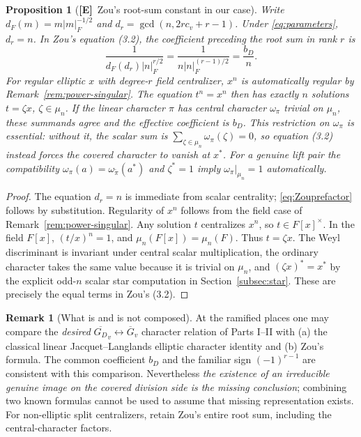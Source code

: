 \documentclass[11pt]{article}
\newcommand{\Gb}{\overline G}
\newcommand{\GDb}{\overline{G_D}}
\newcommand{\Etag}{\textnormal{\textbf{[E]}}}
\theoremstyle{plain}
\newtheorem{proposition}[theorem]{Proposition}
\theoremstyle{definition}
\newtheorem{remark}[theorem]{Remark}
\begin{document}
\begin{proposition}[\Etag\ Zou's root-sum constant in our case]\label{prop:Zouconstant}
Write $d_F(m)=m|m|_F^{-1/2}$ and
$d_r=\gcd(n,2rc_v+r-1)$.  Under \eqref{eq:parameters},
$d_r=n$.  In Zou's equation (3.2), the coefficient preceding
the root sum in rank $r$ is
\begin{equation}\label{eq:Zouprefactor}
 \frac{1}{d_F(d_r)|n|_F^{r/2}}
 =\frac{1}{n|n|_F^{(r-1)/2}}=\frac{b_D}{n}.
\end{equation}
For regular elliptic $x$ with degree-$r$ field centralizer,
$x^n$ is automatically regular by Remark~\ref{rem:power-singular}.
The equation $t^n=x^n$ then has exactly $n$ solutions
$t=\zeta x$, $\zeta\in\mu_n$.  If the linear character
$\pi$ has central character $\omega_\pi$ trivial on $\mu_n$,
these summands agree and the effective coefficient is $b_D$.
This restriction on $\omega_\pi$ is essential: without it, the
scalar sum is $\sum_{\zeta\in\mu_n}\omega_\pi(\zeta)=0$,
so equation (3.2) instead forces the covered character to vanish
at $x^*$.  For a genuine lift pair the compatibility
$\omega_\pi(a)=\omega_{\widetilde\pi}(a^*)$
and $\zeta^*=1$ imply $\omega_\pi|_{\mu_n}=1$ automatically.
\end{proposition}
\begin{proof}
The equation $d_r=n$ is immediate from scalar centrality;
\eqref{eq:Zouprefactor} follows by substitution.  Regularity of
$x^n$ follows from the field case of Remark~\ref{rem:power-singular}.
Any solution $t$ centralizes $x^n$, so $t\in F[x]^\times$.  In the field $F[x]$, $(t/x)^n=1$,
and $\mu_n(F[x])=\mu_n(F)$.  Thus $t=\zeta x$.
The Weyl discriminant is invariant under central scalar
multiplication, the ordinary character takes the same value
because it is trivial on $\mu_n$, and $(\zeta x)^*=x^*$
by the explicit odd-$n$ scalar star computation in
Section~\ref{subsec:star}.
These are precisely the equal terms in Zou's (3.2).
\end{proof}

\begin{remark}[What is and is not composed]
At the ramified places one may compare the \emph{desired}
$\GDb_v\leftrightarrow\Gb_v$ character relation of Parts I--II
with (a) the classical linear Jacquet--Langlands elliptic
character identity and (b) Zou's formula.  The common coefficient
$b_D$ and the familiar sign $(-1)^{r-1}$ are consistent with
this comparison.  Nevertheless \emph{the existence of an
irreducible genuine image on the covered division side is the
missing conclusion}; combining two known formulas cannot be
used to assume that missing representation exists.
For non-elliptic split centralizers, retain Zou's entire
root sum, including the central-character factors.
\end{remark}
\end{document}
